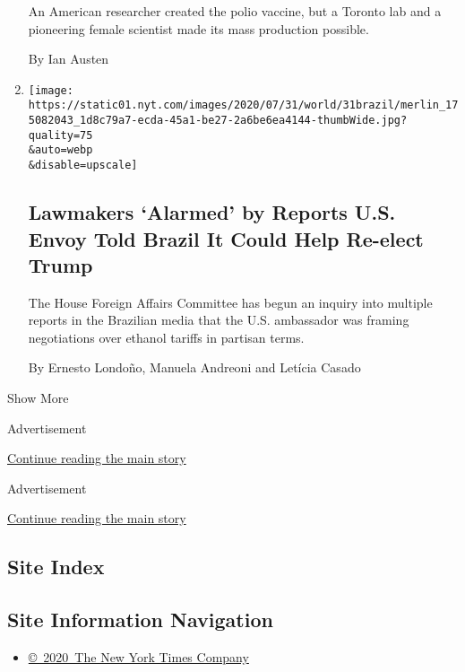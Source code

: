 \begin{enumerate}
  An American researcher created the polio vaccine, but a Toronto lab
  and a pioneering female scientist made its mass production possible.

  By Ian Austen
\item
  \href{/2020/07/31/world/americas/brazil-trump-ethanol-chapman.html}{}

  \texttt{[image: https://static01.nyt.com/images/2020/07/31/world/31brazil/merlin\_175082043\_1d8c79a7-ecda-45a1-be27-2a6be6ea4144-thumbWide.jpg?quality=75\\\&auto=webp\\\&disable=upscale]}

  \hypertarget{lawmakers-alarmed-by-reports-us-envoy-told-brazil-it-could-help-re-elect-trump}{%
  \subsection{Lawmakers `Alarmed' by Reports U.S. Envoy Told Brazil It
  Could Help Re-elect
  Trump}\label{lawmakers-alarmed-by-reports-us-envoy-told-brazil-it-could-help-re-elect-trump}}

  The House Foreign Affairs Committee has begun an inquiry into multiple
  reports in the Brazilian media that the U.S. ambassador was framing
  negotiations over ethanol tariffs in partisan terms.

  By Ernesto Londoño, Manuela Andreoni and Letícia Casado
\end{enumerate}

Show More

Advertisement

\protect\hyperlink{after-mid1}{Continue reading the main story}

Advertisement

\protect\hyperlink{after-mktg}{Continue reading the main story}

\hypertarget{site-index}{%
\subsection{Site Index}\label{site-index}}

\hypertarget{site-information-navigation}{%
\subsection{Site Information
Navigation}\label{site-information-navigation}}

\begin{itemize}
\tightlist
\item
  \href{https://help.nytimes.com/hc/en-us/articles/115014792127-Copyright-notice}{©~2020~The
  New York Times Company}
\end{itemize}

